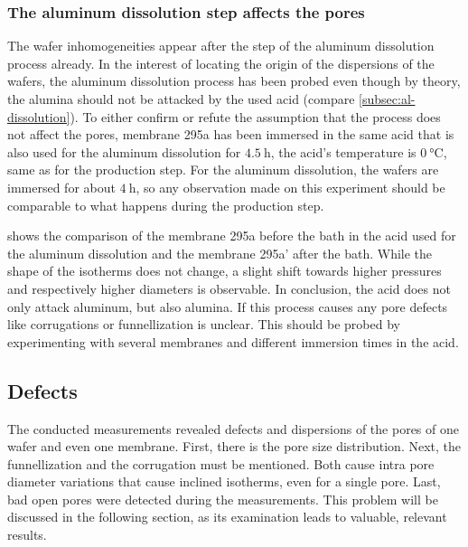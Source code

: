 \documentclass[../thesis.tex]{subfiles}
\begin{document}
        \subsubsection{The aluminum dissolution step affects the pores}
        \label{sssec:al-diss-bath}

          The wafer inhomogeneities appear after the step of the aluminum dissolution process already. In the interest of locating the origin of the dispersions of the wafers, the aluminum dissolution process has been probed even though by theory, the alumina should not be attacked by the used acid (compare \cref{subsec:al-dissolution}). To either confirm or refute the assumption that the process does not affect the pores, membrane 295a has been immersed in the same acid that is also used for the aluminum dissolution for $\SI{4,5}{\hour}$, the acid's temperature is $\SI{0}{\celsius}$, same as for the production step. For the aluminum dissolution, the wafers are immersed for about $\SI{4}{\hour}$, so any observation made on this experiment should be comparable to what happens during the production step.
          \medskip

           shows the comparison of the membrane 295a before the bath in the acid used for the aluminum dissolution and the membrane 295a' after the bath. While the shape of the isotherms does not change, a slight shift towards higher pressures and respectively higher diameters is observable. In conclusion, the acid does not only attack aluminum, but also alumina. If this process causes any pore defects like corrugations or funnellization is unclear. This should be probed by experimenting with several membranes and different immersion times in the acid.

          


    \subsection{Defects}
    \label{subsec:defects}

        The conducted measurements revealed defects and dispersions of the pores of one wafer and even one membrane. First, there is the pore size distribution. Next, the funnellization and the corrugation must be mentioned. Both cause intra pore diameter variations that cause inclined isotherms, even for a single pore. Last, bad open pores were detected during the measurements. This problem will be discussed in the following section, as its examination leads to valuable, relevant results.
\end{document}
